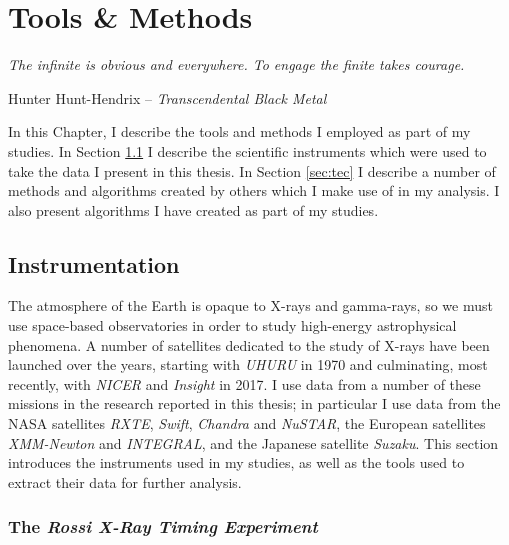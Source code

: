 \chapter{Tools \& Methods}

\epigraph{\textit{The infinite is obvious and everywhere. To engage the finite takes courage.}}{Hunter Hunt-Hendrix -- \textit{Transcendental Black Metal}}

\vspace{1cm}

\par\noindent In this Chapter, I describe the tools and methods I employed as part of my studies.  In Section \ref{sec:sat} I describe the scientific instruments which were used to take the data I present in this thesis.  In Section \ref{sec:tec} I describe a number of methods and algorithms created by others which I make use of in my analysis.  I also present algorithms I have created as part of my studies.

\section{Instrumentation}

\label{sec:sat}

\par The atmosphere of the Earth is opaque to X-rays and gamma-rays, so we must use space-based observatories in order to study high-energy astrophysical phenomena.  A number of satellites dedicated to the study of X-rays have been launched over the years, starting with \textit{UHURU} in 1970 \citep{Giacconi_Uhuru} and culminating, most recently, with \textit{NICER} \citep{Gendreau_Nicer} and \textit{Insight} \citep{Li_HXMT} in 2017.  I use data from a number of these missions in the research reported in this thesis; in particular I use data from the NASA satellites \textit{RXTE}, \textit{Swift}, \textit{Chandra} and \textit{NuSTAR}, the European satellites \textit{XMM-Newton} and \textit{INTEGRAL}, and the Japanese satellite \textit{Suzaku}.  This section introduces the instruments used in my studies, as well as the tools used to extract their data for further analysis.

\subsection{The \textit{Rossi X-Ray Timing Experiment}}

